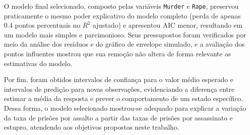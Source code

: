 \documentclass[a4paper]{modeloUFCG} %
\begin{document}
O modelo final selecionado, composto pelas variáveis \texttt{Murder} e \texttt{Rape}, preservou praticamente o mesmo poder explicativo do modelo
completo (perda de apenas 0.4 pontos percentuais no
\(R^2\) ajustado) e apresentou AIC menor, resultando em um modelo mais simples e parcimonioso. Seus pressupostos foram verificados por
meio da análise dos resíduos e do gráfico de envelope simulado, e a avaliação dos pontos influentes mostrou que sua remoção não altera
de forma relevante as estimativas do modelo.

Por fim, foram obtidos intervalos de confiança para o valor médio esperado e intervalos de predição para novas observações, evidenciando
a diferença entre estimar a média da resposta e prever o comportamento de um estado específico. Dessa forma, o modelo selecionado mostrou-se
adequado para explicar a variação da taxa de prisões por assalto a partir das taxas de prisões por assassinato e estupro, atendendo aos
objetivos propostos neste trabalho.









\end{document}
